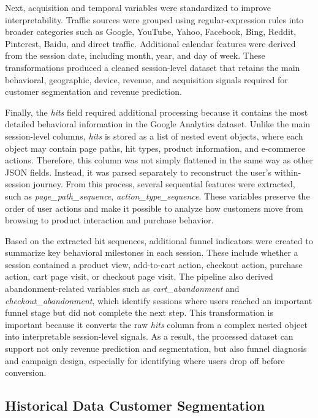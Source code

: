 \documentclass[conference]{IEEEtran}
\begin{document}
Next, acquisition and temporal variables were standardized to improve interpretability. Traffic sources were grouped using regular-expression rules into broader categories such as Google, YouTube, Yahoo, Facebook, Bing, Reddit, Pinterest, Baidu, and direct traffic. Additional calendar features were derived from the session date, including month, year, and day of week. These transformations produced a cleaned session-level dataset that retains the main behavioral, geographic, device, revenue, and acquisition signals required for customer segmentation and revenue prediction.

Finally, the \textit{hits} field required additional processing because it contains the most detailed behavioral information in the Google Analytics dataset. Unlike the main session-level columns, \textit{hits} is stored as a list of nested event objects, where each object may contain page paths, hit types, product information, and e-commerce actions. Therefore, this column was not simply flattened in the same way as other JSON fields. Instead, it was parsed separately to reconstruct the user's within-session journey. From this process, several sequential features were extracted, such as \textit{page\_path\_sequence}, \textit{action\_type\_sequence}. These variables preserve the order of user actions and make it possible to analyze how customers move from browsing to product interaction and purchase behavior.

Based on the extracted hit sequences, additional funnel indicators were created to summarize key behavioral milestones in each session. These include whether a session contained a product view, add-to-cart action, checkout action, purchase action, cart page visit, or checkout page visit. The pipeline also derived abandonment-related variables such as \textit{cart\_abandonment} and \textit{checkout\_abandonment}, which identify sessions where users reached an important funnel stage but did not complete the next step. This transformation is important because it converts the raw \textit{hits} column from a complex nested object into interpretable session-level signals. As a result, the processed dataset can support not only revenue prediction and segmentation, but also funnel diagnosis and campaign design, especially for identifying where users drop off before conversion.
\subsection{Historical Data Customer Segmentation}
\end{document}
